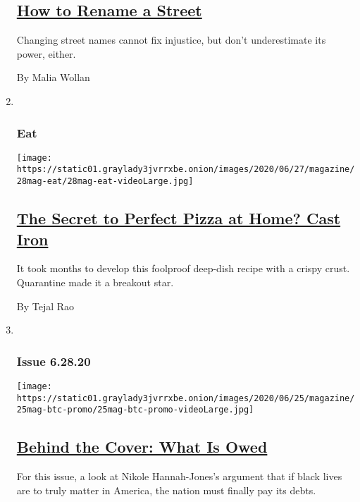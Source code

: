 \begin{enumerate}
  \hypertarget{how-to-rename-a-street}{%
  \subsection{\texorpdfstring{\href{/2020/06/23/magazine/how-to-rename-a-street.html}{How
  to Rename a
  Street}}{How to Rename a Street}}\label{how-to-rename-a-street}}

  Changing street names cannot fix injustice, but don't underestimate
  its power, either.

  By Malia Wollan
\item ~
  \hypertarget{eat}{%
  \subsubsection{Eat}\label{eat}}

  \texttt{[image: https://static01.graylady3jvrrxbe.onion/images/2020/06/27/magazine/28mag-eat/28mag-eat-videoLarge.jpg]}

  \hypertarget{the-secret-to-perfect-pizza-at-home-cast-iron}{%
  \subsection{\texorpdfstring{\href{/2020/06/24/magazine/the-secret-to-perfect-pizza-at-home-cast-iron.html}{The
  Secret to Perfect Pizza at Home? Cast
  Iron}}{The Secret to Perfect Pizza at Home? Cast Iron}}\label{the-secret-to-perfect-pizza-at-home-cast-iron}}

  It took months to develop this foolproof deep-dish recipe with a
  crispy crust. Quarantine made it a breakout star.

  By Tejal Rao
\item ~
  \hypertarget{issue-62820}{%
  \subsubsection{Issue 6.28.20}\label{issue-62820}}

  \texttt{[image: https://static01.graylady3jvrrxbe.onion/images/2020/06/25/magazine/25mag-btc-promo/25mag-btc-promo-videoLarge.jpg]}

  \hypertarget{behind-the-cover-what-is-owed}{%
  \subsection{\texorpdfstring{\href{/2020/06/25/magazine/behind-the-cover-what-is-owed.html}{Behind
  the Cover: What Is
  Owed}}{Behind the Cover: What Is Owed}}\label{behind-the-cover-what-is-owed}}

  For this issue, a look at Nikole Hannah-Jones's argument that if black
  lives are to truly matter in America, the nation must finally pay its
  debts.
\end{enumerate}

